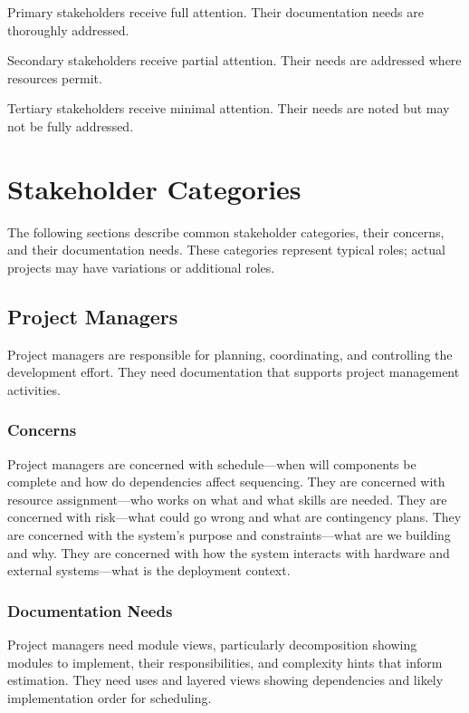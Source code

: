 \documentclass[11pt]{article}
\begin{document}
Primary stakeholders receive full attention. Their documentation needs are thoroughly addressed.

Secondary stakeholders receive partial attention. Their needs are addressed where resources permit.

Tertiary stakeholders receive minimal attention. Their needs are noted but may not be fully addressed.

\section{Stakeholder Categories}

The following sections describe common stakeholder categories, their concerns, and their documentation needs. These categories represent typical roles; actual projects may have variations or additional roles.

\subsection{Project Managers}

Project managers are responsible for planning, coordinating, and controlling the development effort. They need documentation that supports project management activities.

\subsubsection{Concerns}

Project managers are concerned with schedule---when will components be complete and how do dependencies affect sequencing. They are concerned with resource assignment---who works on what and what skills are needed. They are concerned with risk---what could go wrong and what are contingency plans. They are concerned with the system's purpose and constraints---what are we building and why. They are concerned with how the system interacts with hardware and external systems---what is the deployment context.

\subsubsection{Documentation Needs}

Project managers need module views, particularly decomposition showing modules to implement, their responsibilities, and complexity hints that inform estimation. They need uses and layered views showing dependencies and likely implementation order for scheduling.
\end{document}
